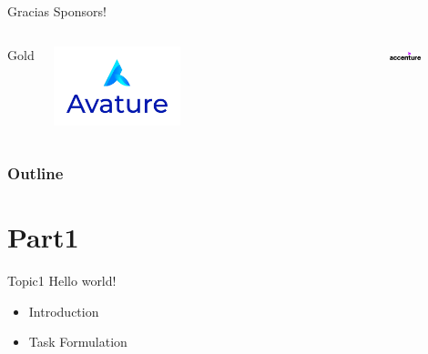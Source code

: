 \documentclass{beamer}
\begin{document}
\begin{frame}{Gracias Sponsors!}
\begin{columns}[t]
    \end{columns}
    \begin{columns}[t]
        \centering
        Gold\\
        \begin{minipage}{0.5\textwidth}
            \centering
            \includegraphics[width=0.4\textwidth,keepaspectratio]{logos/avature.jpg}
        \end{minipage}%
        \begin{minipage}{0.5\textwidth}
            \centering
            \includegraphics[width=0.4\textwidth,keepaspectratio]{logos/Acc_Logo_Black_Purple_RGB.png}
        \end{minipage}
    \end{columns}
\end{frame}


\begin{frame}
\frametitle{Outline}
\tableofcontents
\end{frame}


\section{Part1}

\begin{frame}{Topic1}
Hello world! 
\begin{itemize}
    \item Introduction 
    \item Task Formulation
\end{itemize}
\end{frame}
\end{document}
